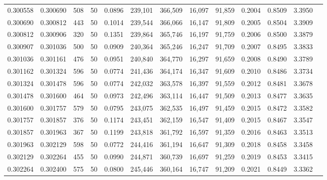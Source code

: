 \begin{tabular}{rrrrrrrrrrrrr}
0.300558 & 0.300690 &   508 &  50 &                                     0.0896 & 239,101 & 366,509 &  16,097 &  91,859 & 0.2004 & 0.8509 & 3.3950 \\
0.300690 & 0.300812 &   443 &  50 &                                     0.1014 & 239,544 & 366,066 &  16,147 &  91,809 & 0.2005 & 0.8504 & 3.3909 \\
0.300812 & 0.300906 &   320 &  50 &                                     0.1351 & 239,864 & 365,746 &  16,197 &  91,759 & 0.2006 & 0.8500 & 3.3879 \\
0.300907 & 0.301036 &   500 &  50 &                                     0.0909 & 240,364 & 365,246 &  16,247 &  91,709 & 0.2007 & 0.8495 & 3.3833 \\
0.301036 & 0.301161 &   476 &  50 &                                     0.0951 & 240,840 & 364,770 &  16,297 &  91,659 & 0.2008 & 0.8490 & 3.3789 \\
0.301162 & 0.301324 &   596 &  50 &                                     0.0774 & 241,436 & 364,174 &  16,347 &  91,609 & 0.2010 & 0.8486 & 3.3734 \\
0.301324 & 0.301478 &   596 &  50 &                                     0.0774 & 242,032 & 363,578 &  16,397 &  91,559 & 0.2012 & 0.8481 & 3.3678 \\
0.301478 & 0.301600 &   464 &  50 &                                     0.0973 & 242,496 & 363,114 &  16,447 &  91,509 & 0.2013 & 0.8477 & 3.3635 \\
0.301600 & 0.301757 &   579 &  50 &                                     0.0795 & 243,075 & 362,535 &  16,497 &  91,459 & 0.2015 & 0.8472 & 3.3582 \\
0.301757 & 0.301857 &   376 &  50 &                                     0.1174 & 243,451 & 362,159 &  16,547 &  91,409 & 0.2015 & 0.8467 & 3.3547 \\
0.301857 & 0.301963 &   367 &  50 &                                     0.1199 & 243,818 & 361,792 &  16,597 &  91,359 & 0.2016 & 0.8463 & 3.3513 \\
0.301963 & 0.302129 &   598 &  50 &                                     0.0772 & 244,416 & 361,194 &  16,647 &  91,309 & 0.2018 & 0.8458 & 3.3458 \\
0.302129 & 0.302264 &   455 &  50 &                                     0.0990 & 244,871 & 360,739 &  16,697 &  91,259 & 0.2019 & 0.8453 & 3.3415 \\
0.302264 & 0.302400 &   575 &  50 &                                     0.0800 & 245,446 & 360,164 &  16,747 &  91,209 & 0.2021 & 0.8449 & 3.3362 \\

\end{tabular}
